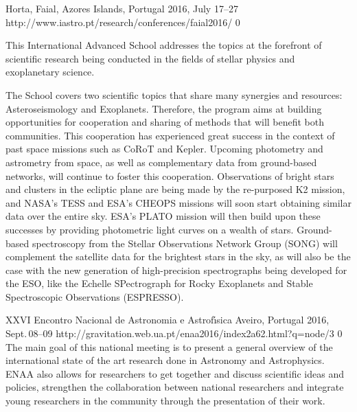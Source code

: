 {Horta, Faial, Azores Islands, Portugal}%
{2016, July 17--27}%
{http://www.iastro.pt/research/conferences/faial2016/}%
{0}%
{This International Advanced School addresses the topics at the forefront of scientific research being conducted in the fields of stellar physics and exoplanetary science.

The School covers two scientific topics that share many synergies and resources: Asteroseismology and Exoplanets.
Therefore, the program aims at building opportunities for cooperation and sharing of methods that will benefit both communities.
This cooperation has experienced great success in the context of past space missions such as CoRoT and Kepler.
Upcoming photometry and astrometry from space, as well as complementary data from ground-based networks, will continue to foster this cooperation.
Observations of bright stars and clusters in the ecliptic plane are being made by the re-purposed K2 mission, and NASA's TESS and ESA's CHEOPS missions will soon start obtaining similar data over the entire sky.
ESA's PLATO mission will then build upon these successes by providing photometric light curves on a wealth of stars.
Ground-based spectroscopy from the Stellar Observations Network Group (SONG) will complement the satellite data for the brightest stars in the sky, as will also be the case with the new generation of high-precision spectrographs being developed for the ESO, like the Echelle SPectrograph for Rocky Exoplanets and Stable Spectroscopic Observations (ESPRESSO).}%

 {XXVI Encontro Nacional de Astronomia e Astrof\'{\i}sica}%
{Aveiro, Portugal}%
{2016, Sept.\,08--09}%
{http://gravitation.web.ua.pt/enaa2016/index2a62.html?q=node/3}%
{0}%
{The main goal of this national meeting is to present a general overview of the international state of the art research done in Astronomy and Astrophysics.
    ENAA also allows for researchers to get together and discuss scientific ideas and policies, strengthen the collaboration between national researchers and integrate young researchers in the community through the presentation of their work.}


